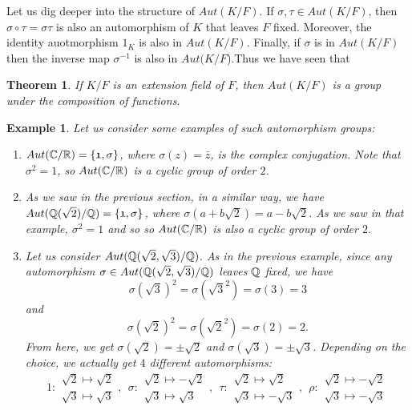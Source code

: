 \documentclass[12pt]{article}
\theoremstyle{plain}
\newtheorem{example}{Example}
\newtheorem{theorem}{Theorem}
\theoremstyle{definition}
\theoremstyle{remark}
\begin{document}
Let us dig deeper into the structure of $Aut(K/F)$. If $\sigma, \tau \in Aut(K/F)$, then $\sigma\circ\tau = \sigma\tau$ is also an automorphism of $K$ that leaves $F$ fixed. Moreover, the identity auotmorphism $\mathfrak{1}_K$ is also in $Aut(K/F)$. Finally, if $\sigma$ is in $Aut(K/F)$ then the inverse map $\sigma^{-1}$ is also in $Aut(K/F$).Thus we have seen that 
\begin{theorem}
If $K/F$ is an extension field of $F$, then $Aut(K/F)$ is a group under the composition of functions. 
\end{theorem}
\begin{example}
Let us consider some examples of such automorphism groups:
\begin{enumerate}
\item $Aut(\mathbb{C}/\mathbb{R}) = \{\mathfrak{1}, \sigma\}$, where $\sigma(z) = \bar{z}$, is the complex conjugation. Note that $\sigma^2=\mathfrak{1}$, so $Aut(\mathbb{C}/\mathbb{R})$ is a cyclic group of order $2$.
\item As we saw in the previous section, in a similar way, we have $Aut(\mathbb{Q}(\sqrt{2})/\mathbb{Q})=\{\mathfrak{1}, \sigma\}$, where 
$\sigma(a+b\sqrt{2})=a-b\sqrt{2}$. As we saw in that example, $\sigma^2=\mathfrak{1}$ and so so $Aut(\mathbb{C}/\mathbb{R})$ is also a cyclic group of order $2$.
\item Let us consider $Aut(\mathbb{Q}(\sqrt{2}, \sqrt{3})/\mathbb{Q})$. 
As in the previous example, since any automorphism $\sigma \in Aut(\mathbb{Q}(\sqrt{2}, \sqrt{3})/\mathbb{Q})$ leaves $\mathbb{Q}$ fixed, we have 
$$\sigma(\sqrt{3})^2=\sigma(\sqrt{3}^2)=\sigma(3)=3$$ and 
$$\sigma(\sqrt{2})^2=\sigma(\sqrt{2}^2)=\sigma(2)=2.$$
From here, we get $\sigma(\sqrt{2})=\pm\sqrt{2}$ and $\sigma(\sqrt{3}) = \pm\sqrt{3}$. Depending on the choice, we actually get $4$ different automorphisms:
$$\mathfrak{1}:\begin{array}{c}
      \sqrt{2} \mapsto \sqrt{2}\\
      \sqrt{3} \mapsto \sqrt{3}
\end{array}, \:\: \mathfrak{\sigma}:\begin{array}{c}
      \sqrt{2} \mapsto -\sqrt{2}\\
      \sqrt{3} \mapsto \sqrt{3}
\end{array}, \:\: \mathfrak{\tau}:\begin{array}{c}
      \sqrt{2} \mapsto \sqrt{2}\\
      \sqrt{3} \mapsto -\sqrt{3}
\end{array}, \:\: \mathfrak{\rho}:\begin{array}{c}
      \sqrt{2} \mapsto -\sqrt{2}\\
      \sqrt{3} \mapsto -\sqrt{3}
\end{array}$$


\end{enumerate}
\end{example}
\end{document}
